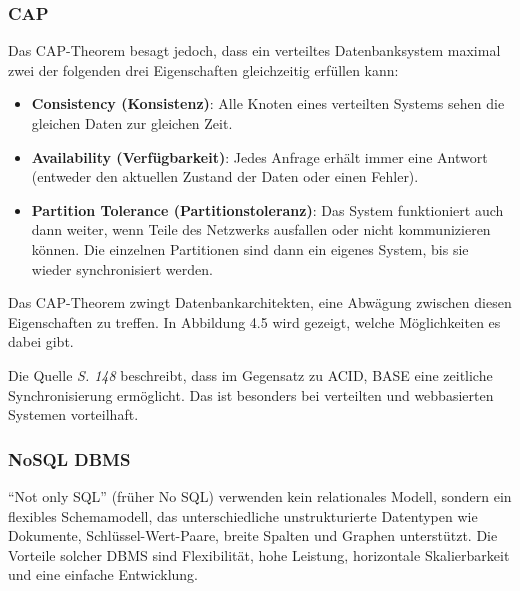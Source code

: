 \subsubsection{CAP}

\noindent Das CAP-Theorem besagt jedoch, dass ein verteiltes Datenbanksystem maximal zwei der folgenden drei Eigenschaften gleichzeitig erfüllen kann:

\begin{itemize}
    \item \textbf{Consistency (Konsistenz)}: Alle Knoten eines verteilten Systems sehen die gleichen Daten zur gleichen Zeit.
    \item \textbf{Availability (Verfügbarkeit)}: Jedes Anfrage erhält immer eine Antwort (entweder den aktuellen Zustand der Daten oder einen Fehler).
    \item \textbf{Partition Tolerance (Partitionstoleranz)}: Das System funktioniert auch dann weiter, wenn Teile des Netzwerks ausfallen oder nicht kommunizieren können. Die einzelnen Partitionen sind dann ein eigenes System, bis sie wieder synchronisiert werden.
\end{itemize}

\noindent Das CAP-Theorem zwingt Datenbankarchitekten, eine Abwägung zwischen diesen Eigenschaften zu treffen. In Abbildung 4.5 wird gezeigt, welche Möglichkeiten es dabei gibt.


\vspace{3mm}\noindent Die Quelle \cite{Buch:AndreasMaier} \textit{S. 148} beschreibt, dass im Gegensatz zu ACID, BASE eine zeitliche  Synchronisierung ermöglicht. Das ist besonders bei verteilten und webbasierten Systemen vorteilhaft.\newline


\newpage
\subsubsection{NoSQL DBMS}
\enquote{Not only SQL} (früher No SQL) verwenden kein relationales Modell, sondern ein flexibles Schemamodell, das unterschiedliche unstrukturierte Datentypen wie Dokumente, Schlüssel-Wert-Paare, breite Spalten und Graphen unterstützt. Die Vorteile solcher DBMS sind Flexibilität, hohe Leistung, horizontale Skalierbarkeit und eine einfache Entwicklung. 

